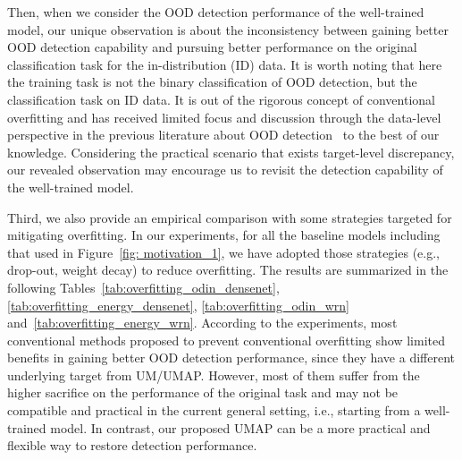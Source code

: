 \documentclass{article}
\theoremstyle{plain}
\theoremstyle{definition}
\theoremstyle{remark}
\begin{document}
Then, when we consider the OOD detection performance of the well-trained model, our unique observation is about the inconsistency between gaining better OOD detection capability and pursuing better performance on the original classification task for the in-distribution (ID) data. It is worth noting that here the training task is not the binary classification of OOD detection, but the classification task on ID data. It is out of the rigorous concept of conventional overfitting and has received limited focus and discussion through the data-level perspective in the previous literature about OOD detection~\citep{yang2021generalized,yangopenood2022} to the best of our knowledge. Considering the practical scenario that exists target-level discrepancy, our revealed observation may encourage us to revisit the detection capability of the well-trained model.

Third, we also provide an empirical comparison with some strategies targeted for mitigating overfitting. In our experiments, for all the baseline models including that used in Figure~\ref{fig: motivation_1}, we have adopted those strategies \citep{booktitles_jmlr_dropout, TheElementsHastie2009} (e.g., drop-out, weight decay) to reduce overfitting. 
The results are summarized in the following Tables~\ref{tab:overfitting_odin_densenet}, \ref{tab:overfitting_energy_densenet}, \ref{tab:overfitting_odin_wrn} and~\ref{tab:overfitting_energy_wrn}. According to the experiments, most conventional methods proposed to prevent conventional overfitting show limited benefits in gaining better OOD detection performance, since they have a different underlying target from UM/UMAP. However, most of them suffer from the higher sacrifice on the performance of the original task and may not be compatible and practical in the current general setting, i.e., starting from a well-trained model.
In contrast, our proposed UMAP can be a more practical and flexible way to restore detection performance.
\end{document}

